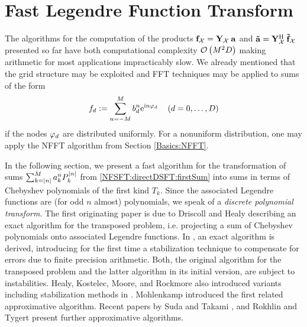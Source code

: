 \section{Fast Legendre Function Transform}
\label{DSFT:FLFT}
The algorithms for the computation of the products $\mathbf{f}_{\mathcal{X}} = \mathbf{Y}_{\mathcal{X}} \: \mathbf{a}$ and 
$\mathbf{\tilde{a}} = \mathbf{Y}_{\mathcal{X}}^{\text{\rm{H}}} \: \mathbf{\tilde{f}}_{\mathcal{X}}$ presented so far have both 
computational complexity $\mathcal{O}\left(M^2D\right)$ making arithmetic for most applications impracticably slow. 
We already mentioned that the grid structure may be exploited and FFT techniques may be applied to sums of 
the form
\[
  f_{d} := \sum_{n = -M}^M b^n_d \mbox{\rm{e}}^{\mbox{\scriptsize\rm{i}} n \varphi_{d}} \quad \left(d = 0,\ldots,D\right)
\]
if the nodes $\varphi_d$ are distributed uniformly. For a nonuniform distribution, one may apply the NFFT 
algorithm from Section \ref{Basics:NFFT}. 

In the following section, we present a fast algorithm for the transformation of sums 
$\sum_{k=\left\vert n\right\vert}^M a_{k}^n P_{k}^{\left\vert n\right\vert}$ from \eqref{NFSFT:directDSFT:firstSum} into sums 
in terms of Chebyshev polynomials of the first kind $T_{k}$. Since the associated Legendre functions are (for odd $n$ almost) 
polynomials, we speak of a \emph{discrete polynomial transform}. The first originating
paper \cite{drhe} is due to Driscoll and Healy describing an exact algorithm for the transposed
problem, i.e. projecting a sum of Chebyshev polynomials onto associated Legendre functions. 
In \cite{postta97}, an exact algorithm is derived, introducing for the first time a stabilization 
technique to compensate for errors due to finite precision arithmetic. Both, the original algorithm 
for the transposed problem and the latter algorithm in its initial version, are subject to 
instabilities. Healy, Kostelec, Moore, and Rockmore also introduced variants including stabilization 
methods in \cite{HeRoKoMo}. Mohlenkamp \cite{Mo99} introduced the first related approximative algorithm. 
Recent papers by Suda and Takami \cite{SuTa01}, and Rokhlin and Tygert \cite{roty} present further 
approximative algorithms. 

